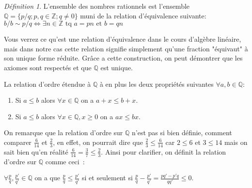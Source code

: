 \documentclass[oneside,12pt,french,table]{book}
\theoremstyle{definition}
\theoremstyle{plain}
\theoremstyle{remark}
\newtheorem{defi}[definition]{Définition}
\newcommand{\Zz}{{\mathbb{Z}}}
\newcommand{\Qq}{{\mathbb{Q}}}
\begin{document}
\begin{tcolorbox}
   \begin{defi}
    L'ensemble des nombres rationnels est l'ensemble $\Qq=\{p/q; p,q\in \Zz; q\neq 0 \}$ muni de la relation d'équivalence suivante: 
    $b/b\sim p/q \iff \exists n\in \Zz \text{ tq } a=pn \text{ et } b=qn$
\end{defi}
Vous verrez ce qu'est une relation d'équivalence dans le cours d'algèbre linéaire, mais dans notre cas cette relation signifie simplement qu'une fraction "équivaut" à son unique forme réduite. Grâce a cette construction, on peut démontrer que les axiomes sont respectés et que $\Qq$ est unique. 



La relation d'ordre étendue à $\Qq$ à en plus les deux propriétés suivantes $\forall a,b \in \Qq$:  
\begin{enumerate}[label=\arabic*),resume]
    \item  Si $a\leq b$ alors $\forall x\in \Qq$ on a $a+x\leq b+x$.
    \item Si $a\leq b$ alors $\forall x\in \Qq, x\geq 0 $ on a $ax\leq bx$.
\end{enumerate}
On remarque que la relation d'ordre sur $\Qq$ n'est pas si bien définie, comment comparer $\frac{6}{14}$ et $\frac{2}{3}$, en effet, on pourrait dire que $\frac{2}{3}\leq \frac{6}{14} $ car $2\leq 6$ et $3\leq 14$ mais on sait bien qu'en réalité $\frac{6}{14}=\frac{3}{7}\leq \frac{2}{3}$. Ainsi pour clarifier, on définit la relation d'ordre sur $\Qq$ comme ceci :
\begin{center}
    $\forall \frac{p}{q}, \frac{p'}{q'}\in \Qq$ on a que $\frac{p}{q}\leq \frac{p'}{q'}$ si et seulement si $\frac{p}{q}- \frac{p'}{q'}=\frac{pq'-p'q}{qq'}\leq 0$.
\end{center}


\end{tcolorbox}
\end{document}
